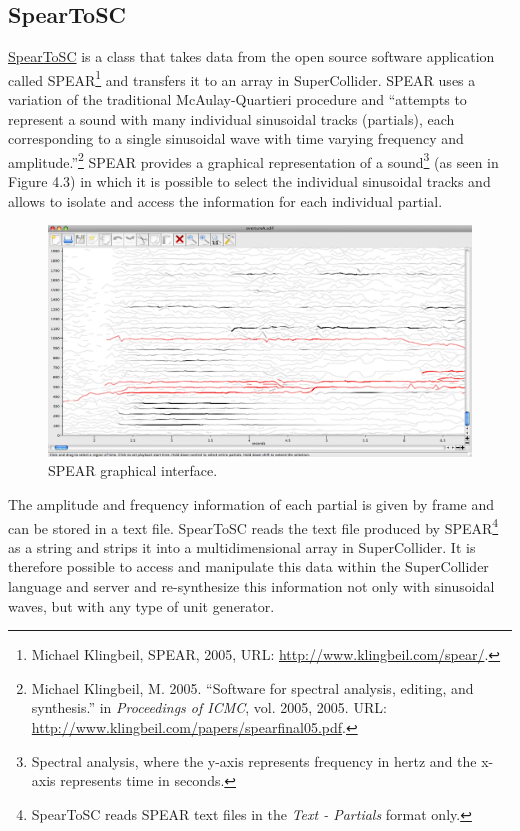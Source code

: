 \subsection{SpearToSC}
\hypertarget{spearsc}{}
\href{http://github.com/freuben/FedeLib/blob/master/SpearToSC/SpearToSC.sc}{SpearToSC} is a class that takes data from the open source software application called SPEAR\footnote{Michael Klingbeil, SPEAR, 2005, URL: \href{http://www.klingbeil.com/spear/}{http://www.klingbeil.com/spear/}.} and transfers it to an array in SuperCollider. SPEAR uses a variation of the traditional McAulay-Quartieri procedure and ``attempts to represent a sound with many individual sinusoidal tracks (partials), each corresponding to a single sinusoidal wave with time varying frequency and amplitude.''\footnote{Michael Klingbeil, M. 2005. ``Software for spectral analysis, editing, and synthesis.'' in \emph{Proceedings of ICMC}, vol. 2005, 2005. URL: \href{http://www.klingbeil.com/papers/spearfinal05.pdf}{http://www.klingbeil.com/papers/spearfinal05.pdf}.} SPEAR provides a graphical representation of a sound\footnote{Spectral analysis, where the y-axis represents frequency in hertz and the x-axis represents time in seconds.} (as seen in Figure 4.3) in which it is possible to select the individual sinusoidal tracks and allows to isolate and access the information for each individual partial. 
\begin{figure}[htbp] %
   \centering
   \includegraphics[width=15cm]{Chapter4/Spear1.tif} %
   \caption{SPEAR graphical interface.}
   \label{fig:example}
\end{figure}
The amplitude and frequency information of each partial is given by frame and can be stored in a text file. SpearToSC reads the text file produced by SPEAR\footnote{SpearToSC reads SPEAR text files in the \emph{Text - Partials} format only.} as a string and strips it into a multidimensional array in SuperCollider. It is therefore possible to access and manipulate this data within the SuperCollider language and server and re-synthesize this information not only with sinusoidal waves, but with any type of unit generator. 

